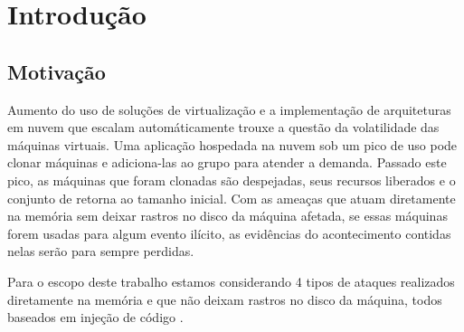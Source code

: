 \documentclass[
	12pt,				%
	openright,			%
	oneside,			%
	a4paper,			%
	english,			%
	brazil,				%
	]{abntex2}
\newcommand{\marcos}[1]{{\color{blue}{MARCOS: #1}}}
\begin{document}
\frenchspacing 


\imprimircapa

\imprimirfolhaderosto


\tableofcontents
\cleardoublepage


\textual

\chapter{Introdução}
\label{chp:intro}

\marcos{Apresente aqui o contexto em que se insere o seu trabalho, sem se preocupar muito com o problema exato a ser resolvido ou como você irá fazê-lo.}

\section{Motivação}
\label{chp:intro-objetivos}

Aumento do uso de soluções de virtualização e a implementação de arquiteturas em nuvem que escalam automáticamente \cite{Amazon2016} trouxe a questão da volatilidade 
das máquinas virtuais. Uma aplicação hospedada na nuvem sob um pico de uso pode clonar máquinas e adiciona-las ao grupo para atender a demanda. Passado 
este pico, as máquinas que foram clonadas são despejadas, seus recursos liberados e o conjunto de retorna ao tamanho inicial. Com as ameaças que atuam diretamente 
na memória sem deixar rastros no disco da máquina afetada, se essas máquinas forem usadas para algum evento ilícito, as evidências do acontecimento contidas nelas 
serão para sempre perdidas.

Para o escopo deste trabalho estamos considerando 4 tipos de ataques realizados diretamente na memória e que não deixam rastros no disco da máquina, todos baseados 
em injeção de código \cite{Case2014}.
\end{document}
